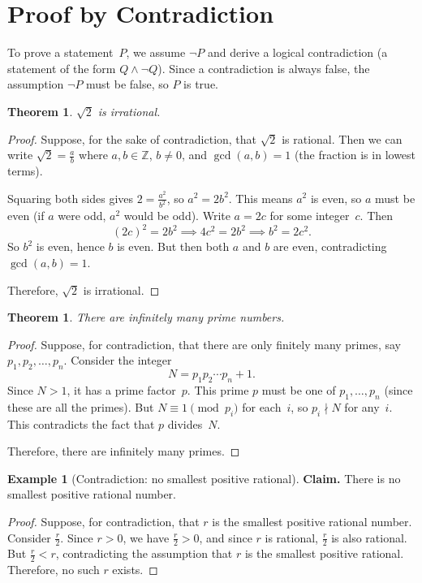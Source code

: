 \documentclass[12pt,a4paper,openany]{book}
\theoremstyle{definition}
\newtheorem{example}[definition]{Example}
\theoremstyle{plain}
\newtheorem{theorem}[definition]{Theorem}
\theoremstyle{remark}
\newcommand{\Z}{\mathbb{Z}}
\begin{document}
\section{Proof by Contradiction}
\label{sec:contradiction-proof}

To prove a statement~$P$, we assume $\lnot P$ and derive a logical contradiction
(a statement of the form $Q \land \lnot Q$). Since a contradiction is always false,
the assumption $\lnot P$ must be false, so $P$ is true.

\begin{theorem}
\label{thm:sqrt2-irrational}
$\sqrt{2}$ is irrational.
\end{theorem}

\begin{proof}
Suppose, for the sake of contradiction, that $\sqrt{2}$ is rational. Then we can
write $\sqrt{2} = \frac{a}{b}$ where $a, b \in \Z$, $b \neq 0$, and
$\gcd(a, b) = 1$ (the fraction is in lowest terms).

Squaring both sides gives $2 = \frac{a^2}{b^2}$, so $a^2 = 2b^2$. This means $a^2$
is even, so $a$ must be even (if $a$ were odd, $a^2$ would be odd). Write $a = 2c$
for some integer~$c$. Then
\[
  (2c)^2 = 2b^2 \implies 4c^2 = 2b^2 \implies b^2 = 2c^2.
\]
So $b^2$ is even, hence $b$ is even. But then both $a$ and $b$ are even, contradicting
$\gcd(a,b) = 1$.

Therefore, $\sqrt{2}$ is irrational.
\end{proof}

\begin{theorem}
\label{thm:infinitely-many-primes}
There are infinitely many prime numbers.
\end{theorem}

\begin{proof}
Suppose, for contradiction, that there are only finitely many primes, say
$p_1, p_2, \dots, p_n$. Consider the integer
\[
  N = p_1 p_2 \cdots p_n + 1.
\]
Since $N > 1$, it has a prime factor~$p$. This prime $p$ must be one of
$p_1, \dots, p_n$ (since these are all the primes). But $N \equiv 1 \pmod{p_i}$
for each~$i$, so $p_i \nmid N$ for any~$i$. This contradicts the fact that $p$
divides~$N$.

Therefore, there are infinitely many primes.
\end{proof}

\begin{example}[Contradiction: no smallest positive rational]
\label{ex:no-smallest-rational}
\textbf{Claim.} There is no smallest positive rational number.

\begin{proof}
Suppose, for contradiction, that $r$ is the smallest positive rational number.
Consider $\frac{r}{2}$. Since $r > 0$, we have $\frac{r}{2} > 0$, and since $r$
is rational, $\frac{r}{2}$ is also rational. But $\frac{r}{2} < r$, contradicting
the assumption that $r$ is the smallest positive rational. Therefore, no such $r$
exists.
\end{proof}
\end{example}
\end{document}
